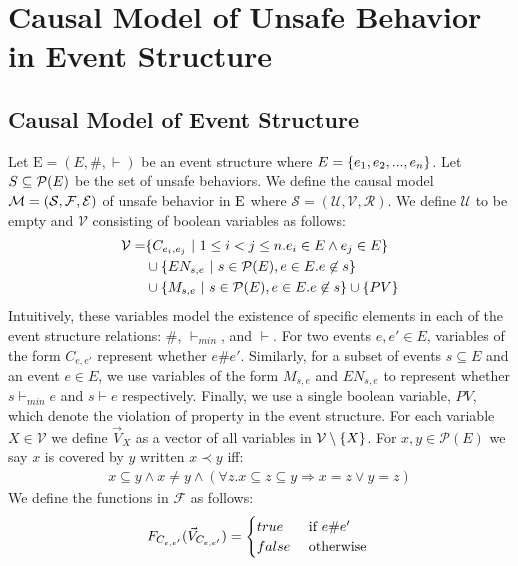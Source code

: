 \section{Causal Model of Unsafe Behavior in Event Structure}

\subsection{Causal Model of Event Structure}
Let $\mathrm{E} = (E,\#,\vdash)$ be an event structure where
$E = \{e_1, e_2, ...,e_n\}$. 
Let $S \subseteq \mathcal{P}(E)$ be the set of unsafe behaviors.
We define the causal model
$\mathcal{M} = (\mathcal{S},\mathcal{F},\mathcal{E})$ of unsafe behavior
in $\mathrm{E}$ where
$\mathcal{S} = (\mathcal{U},\mathcal{V},\mathcal{R})$.
We define $\mathcal{U}$ to be empty and $\mathcal{V}$
consisting of boolean variables as follows:
\begin{align*}
    \mathcal{V} = & \{C_{e_i,e_j} ~|~  1 \leq i < j \leq n.
    e_i \in E \wedge e_j \in E\}                                \\
                  & \cup \{EN_{s,e} ~|~ s \in \mathcal{P}(E),
    e \in E. e \not \in s \}                                  \\
                  & \cup \{M_{s,e} ~|~ s \in \mathcal{P}(E),
        e \in E. e \not \in s \} \cup \{PV\}
\end{align*}
Intuitively, these variables model the existence of specific elements in 
each of the event structure relations: $\#$, $\vdash_{min}$, and $\vdash$.
For two events $e,e' \in E$, variables of the form $C_{e,e'}$ represent whether $e\#e'$.
Similarly, for a subset of events $s \subseteq E$ and an event $e \in E$,
we use variables of the form $M_{s,e}$ and $EN_{s,e}$ to represent 
whether $s \vdash_{min} e$ and $s \vdash e$ respectively.
Finally, we use a single boolean variable, $PV$, which denote the 
violation of property in the event structure.
For each variable $X \in \mathcal{V}$ we define $\vec V_X$ 
as a vector of all variables in $\mathcal{V} \setminus \{X\}$.
For $x,y \in \mathcal{P}(E)$ we say $x$ is covered by $y$ written $ x \prec y$ iff:
\begin{align*}
    x \subseteq y \wedge x \neq y \wedge
    (\forall z. x \subseteq z \subseteq y \Rightarrow x = z
    \vee y = z)
\end{align*}
We define the functions in $\mathcal{F}$ as follows:
$$
    F_{C_{e,e'}}(\vec V_{C_{e,e'}}) = \begin{cases}
        true  & \text{ if } e \# e' \\
        false & \text{ otherwise }
    \end{cases}
$$
